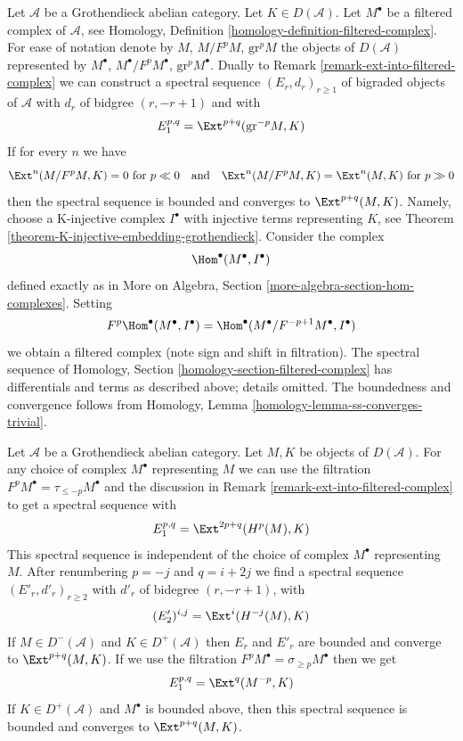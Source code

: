 \begin{remark}
\label{remark-ext-from-filtered-complex}
Let $\mathcal{A}$ be a Grothendieck abelian category. Let
$K \in D(\mathcal{A})$. Let $M^\bullet$ be a filtered complex of
$\mathcal{A}$, see Homology, Definition
\ref{homology-definition-filtered-complex}.
For ease of notation denote by $M$, $M/F^pM$, $\text{gr}^pM$ the
objects of $D(\mathcal{A})$ represented by $M^\bullet$,
$M^\bullet/F^pM^\bullet$, $\text{gr}^pM^\bullet$.
Dually to Remark \ref{remark-ext-into-filtered-complex}
we can construct a spectral sequence $(E_r, d_r)_{r \geq 1}$
of bigraded objects of $\mathcal{A}$ with $d_r$ of bidgree
$(r, -r + 1)$ and
with
$$
E_1^{p, q} = \Ext^{p + q}(\text{gr}^{-p}M, K)
$$
If for every $n$ we have
$$
\Ext^n(M/F^pM, K) = 0 \text{ for } p \ll 0
\quad\text{and}\quad
\Ext^n(M/F^pM, K) = \Ext^n(M, K) \text{ for } p \gg 0
$$
then the spectral sequence is bounded and converges to $\Ext^{p + q}(M, K)$.
Namely, choose a K-injective complex $I^\bullet$ with injective terms
representing $K$, see Theorem \ref{theorem-K-injective-embedding-grothendieck}.
Consider the complex
$$
\Hom^\bullet(M^\bullet, I^\bullet)
$$
defined exactly as in
More on Algebra, Section \ref{more-algebra-section-hom-complexes}.
Setting
$$
F^p\Hom^\bullet(M^\bullet, I^\bullet) =
\Hom^\bullet(M^\bullet/F^{-p + 1}M^\bullet, I^\bullet)
$$
we obtain a filtered complex (note sign and shift in filtration).
The spectral sequence of
Homology, Section \ref{homology-section-filtered-complex}
has differentials and terms as described above; details omitted.
The boundedness and convergence follows from
Homology, Lemma \ref{homology-lemma-ss-converges-trivial}.
\end{remark}

\begin{remark}
\label{remark-spectral-sequences-ext-variant}
Let $\mathcal{A}$ be a Grothendieck abelian category.
Let $M, K$ be objects of $D(\mathcal{A})$.
For any choice of complex $M^\bullet$ representing $M$ we
can use the filtration $F^pM^\bullet = \tau_{\leq -p}M^\bullet$
and the discussion in Remark \ref{remark-ext-into-filtered-complex}
to get a spectral sequence with
$$
E_1^{p, q} = \Ext^{2p + q}(H^p(M), K)
$$
This spectral sequence is independent of the choice of complex $M^\bullet$
representing $M$. After renumbering $p = -j$ and $q = i + 2j$ we find a
spectral sequence $(E'_r, d'_r)_{r \geq 2}$ with $d'_r$ of bidegree
$(r, -r + 1)$, with
$$
(E'_2)^{i, j} = \Ext^i(H^{-j}(M), K)
$$
If $M \in D^-(\mathcal{A})$ and $K \in D^+(\mathcal{A})$
then $E_r$ and $E'_r$ are bounded and converge to $\Ext^{p + q}(M, K)$.
If we use the filtration $F^pM^\bullet = \sigma_{\geq p}M^\bullet$
then we get
$$
E_1^{p, q} = \Ext^q(M^{-p}, K)
$$
If $K \in D^+(\mathcal{A})$ and $M^\bullet$ is bounded above, then
this spectral sequence is bounded and converges to $\Ext^{p + q}(M, K)$.
\end{remark}

